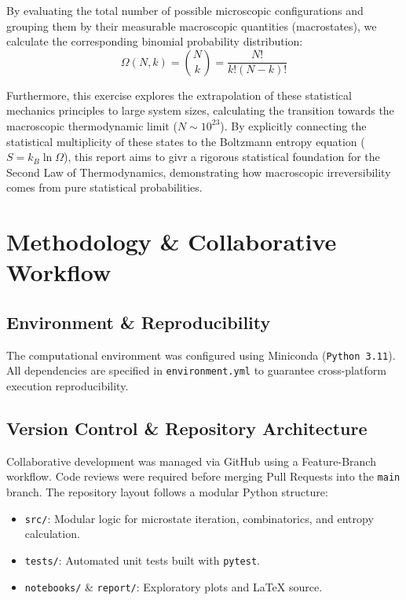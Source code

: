 \documentclass[11pt, a4paper]{article}
\begin{document}
By evaluating the total number of possible microscopic configurations and grouping them by their measurable macroscopic quantities (macrostates), we calculate the corresponding binomial probability distribution:
\begin{equation}
\Omega(N,k)=\binom{N}{k}=\frac{N!}{k!(N-k)!}
\end{equation}

Furthermore, this exercise explores the extrapolation of these statistical mechanics principles to large system sizes, calculating the transition towards the macroscopic thermodynamic limit ($N \sim 10^{23}$). By explicitly connecting the statistical multiplicity of these states to the Boltzmann entropy equation ($S = k_B \ln \Omega$), this report aims to givr a rigorous statistical foundation for the Second Law of Thermodynamics, demonstrating how macroscopic irreversibility comes from pure statistical probabilities.
\section{Methodology \& Collaborative Workflow}
\subsection{Environment \& Reproducibility}
The computational environment was configured using Miniconda (\texttt{Python 3.11}). All dependencies are specified in \texttt{environment.yml} to guarantee cross-platform execution reproducibility.

\subsection{Version Control \& Repository Architecture}
Collaborative development was managed via GitHub using a Feature-Branch workflow. Code reviews were required before merging Pull Requests into the \texttt{main} branch. The repository layout follows a modular Python structure:

\begin{itemize}
    \item \texttt{src/}: Modular logic for microstate iteration, combinatorics, and entropy calculation.
    \item \texttt{tests/}: Automated unit tests built with \texttt{pytest}.
    \item \texttt{notebooks/} \& \texttt{report/}: Exploratory plots and LaTeX source.
\end{itemize}
\end{document}
